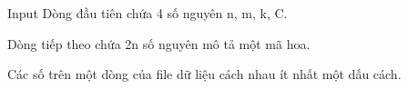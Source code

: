 Input
Dòng đầu tiên chứa 4 số nguyên n, m, k, C.

Dòng tiếp theo chứa 2n số nguyên mô tả một mã hoa.

Các số trên một dòng của file dữ liệu cách nhau ít nhất một dấu cách.